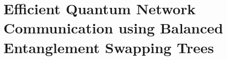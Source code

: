 \chapter[\small{Efficient Quantum Network Communication using Balanced Entanglement\\Swapping Trees}]{Efficient Quantum Network Communication using Balanced Entanglement Swapping Trees}
\label{chap:tqe}


              


% 

%  
% 



%     
